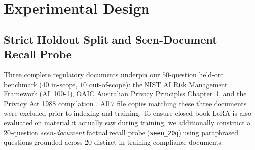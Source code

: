 \documentclass{article}
\begin{document}
\section{Experimental Design}
\label{sec:design}

\subsection{Strict Holdout Split and Seen-Document Recall Probe}
Three complete regulatory documents underpin our $50$-question held-out benchmark ($40$ in-scope, $10$ out-of-scope): the NIST AI Risk Management Framework (AI~100-1), OAIC Australian Privacy Principles Chapter~1, and the Privacy Act 1988 compilation \citep{nist_ai_rmf,oaic_app_guidelines,privacy_act_1988}. All $7$ file copies matching these three documents were excluded prior to indexing and training. To ensure closed-book LoRA is also evaluated on material it actually saw during training, we additionally construct a $20$-question \emph{seen-document} factual recall probe (\texttt{seen\_20q}) using paraphrased questions grounded across $20$ distinct in-training compliance documents.
\end{document}
